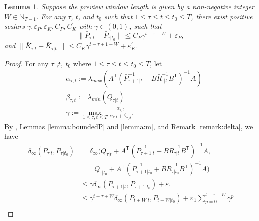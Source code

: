 \documentclass[letterpaper, 10 pt, conference]{ieeeconf}  %
\newcommand{\transpose}{\mathsf{T}}
\newtheorem{lemma}{Lemma}
\begin{document}
\begin{lemma}\label{lemma:boundedPK}
    Suppose the preview window length is given by a non-negative integer $W\in \mathbb{N}_{T-1}$. For any $\tau$, $t$, and $t_{0}$ such that $1\leq \tau\leq t\leq t_{0}\leq T$, there exist positive scalars $\gamma,\varepsilon_{P},\varepsilon_{K},C_{P},C_{K}^{'}$ with $\gamma \in (0,1)$, such that
    \begin{equation*}
        \|\bar{P}_{\tau|t}-\bar{P}_{\tau|t_{0}}\| \leq C_{P}\gamma^{t-\tau+W}+\varepsilon_{P},
    \end{equation*}
    and
        $\|\bar{K}_{\tau|t}-\bar{K}_{\tau|t_{0}}\| \leq C_{K}^{'}\gamma^{t-\tau+1+W}+\varepsilon_{K}^{'}$.
\end{lemma}
\begin{proof}
     For any $\tau$ ,$t$, $t_{0}$ where $1\leq \tau\leq t\leq t_{0}\leq T$, 
     let
     \begin{align*}
        &\alpha_{\tau,t} := \lambda_{max}(A^{\transpose}(\bar{P}_{\tau+1|t}^{-1}+B\bar{R}_{\tau|t}^{-1}B^{\transpose})^{-1}A)\\
        &\beta_{\tau,t} := \lambda_{min}(\bar{Q}_{\tau|t})\\ 
        &\gamma := \max_{1\leq \tau,t \leq T} \frac{\alpha_{\tau,t}}{\alpha_{\tau,t}+\beta_{\tau,t}}. 
     \end{align*}
     By \cite[Lemma D.2]{krauth_finite-time_2019}, Lemmas \ref{lemma:boundedP} and \ref{lemma:m}, and Remark \ref{remark:delta}, we have 
    \begin{align*}
        \delta_{\infty}(\bar{P}_{\tau|t},\bar{P}_{\tau|t_{0}}) &= \delta_{\infty}(\bar{Q}_{\tau|t}+A^{\transpose}(\bar{P}_{\tau+1|t}^{-1}+B\bar{R}_{\tau|t}^{-1}B^{\transpose})^{-1}A,\\
        & \qquad \bar{Q}_{\tau|t_{0}}+A^{\transpose}(\bar{P}_{\tau+1|t_{0}}^{-1}+B\bar{R}_{\tau|t_{0}}^{-1}B^{\transpose})^{-1}A)\\
        &\leq \gamma\delta_{\infty}(\bar{P}_{\tau+1|t},\bar{P}_{\tau+1|t_{0}}) + \varepsilon_{1}\\
        &\leq \gamma^{t-\tau+W}\delta_{\infty}(\bar{P}_{t+W|t},\bar{P}_{t+W|t_{0}}) + \varepsilon_{1}\sum_{p=0}^{t-\tau+W}\gamma^{p}\\

\end{align*}
\end{proof}
\end{document}

